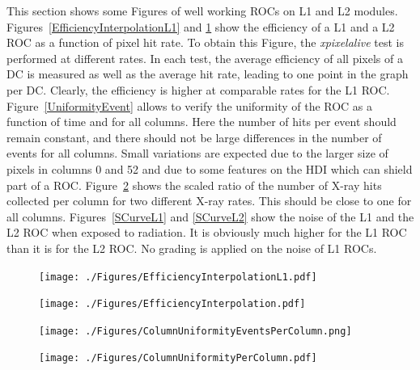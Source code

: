 \documentclass[a4paper,12pt,twoside]{article}
\begin{document}
\begin{appendices}
This section shows some Figures of well working ROCs on L1 and L2 modules. Figures~\ref{EfficiencyInterpolationL1} and \ref{EfficiencyInterpolation} show the efficiency of a L1 and a L2 ROC as a function of pixel hit rate. To obtain this Figure, the \textit{xpixelalive} test is performed at different rates. In each test, the average efficiency of all pixels of a DC is measured as well as the average hit rate, leading to one point in the graph per DC. Clearly, the efficiency is higher at comparable rates for the L1 ROC.  Figure~\ref{UniformityEvent} allows to verify the uniformity of the ROC as a function of time and for all columns. Here the number of hits per event should remain constant, and there should not be large differences in the number of events for all columns. Small variations are expected due to the larger size of pixels in columns 0 and 52 and due to some features on the HDI which can shield part of a ROC. Figure~\ref{Uniformity} shows the scaled ratio of the number of X-ray hits collected per column for two different X-ray rates. This should be close to one for all columns. Figures~\ref{SCurveL1} and \ref{SCurveL2} show the noise of the L1 and the L2 ROC when exposed to radiation. It is obviously much higher for the L1 ROC than it is for the L2 ROC. No grading is applied on the noise of L1 ROCs. 


\begin{figure} [h!]
\centering
\begin{minipage}{.48\textwidth}
  \centering
  \texttt{[image: ./Figures/EfficiencyInterpolationL1.pdf]}
  \label{EfficiencyInterpolationL1}
\end{minipage}%
\hspace{2mm}
\begin{minipage}{.48\textwidth}
  \centering
  \texttt{[image: ./Figures/EfficiencyInterpolation.pdf]}
  \label{EfficiencyInterpolation}
\end{minipage}
\end{figure}

\begin{figure} [h!]
\centering
\begin{minipage}[t]{.48\textwidth}
  \centering
  \texttt{[image: ./Figures/ColumnUniformityEventsPerColumn.png]}
  \label{UniformityEvent}
\end{minipage}%
\hspace{2mm}
\begin{minipage}[t]{.48\textwidth}
  \centering
  \texttt{[image: ./Figures/ColumnUniformityPerColumn.pdf]}
  \label{Uniformity}
\end{minipage}
\end{figure}



\end{appendices}
\end{document}
